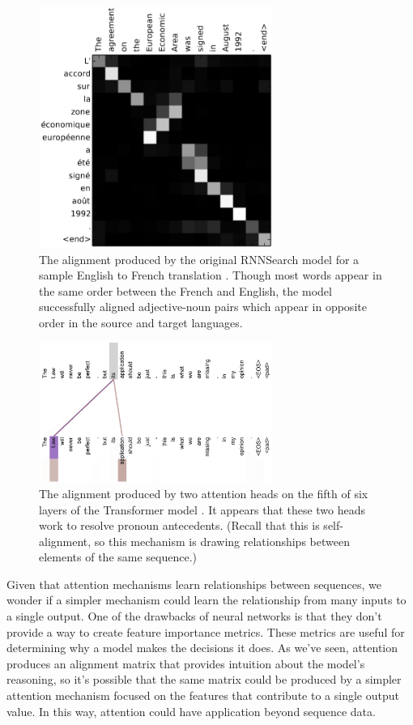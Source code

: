 \documentclass{article}
\begin{document}
\begin{figure}
    \centering
    \includegraphics[width=3in]{figures/alignment.png}
    \caption{The alignment produced by the original RNNSearch model for a sample English to French translation \protect\cite{joint_align_translate}. Though most words appear in the same order between the French and English, the model successfully aligned adjective-noun pairs which appear in opposite order in the source and target languages.}\label{figure:alignment}
\end{figure}

\begin{figure}
    \centering
    \includegraphics[width=3in]{figures/multi_alignment.png}
    \caption{The alignment produced by two attention heads on the fifth of six layers of the Transformer model \protect\cite{attn_all_you_need}. It appears that these two heads work to resolve pronoun antecedents. (Recall that this is self-alignment, so this mechanism is drawing relationships between elements of the same sequence.)}\label{figure:multi_alignment}
\end{figure}

Given that attention mechanisms learn relationships between sequences, we wonder if a simpler mechanism could learn the relationship from many inputs to a single output. One of the drawbacks of neural networks is that they don't provide a way to create feature importance metrics. These metrics are useful for determining why a model makes the decisions it does. As we've seen, attention produces an alignment matrix that provides intuition about the model's reasoning, so it's possible that the same matrix could be produced by a simpler attention mechanism focused on the features that contribute to a single output value. In this way, attention could have application beyond sequence data.
\end{document}
